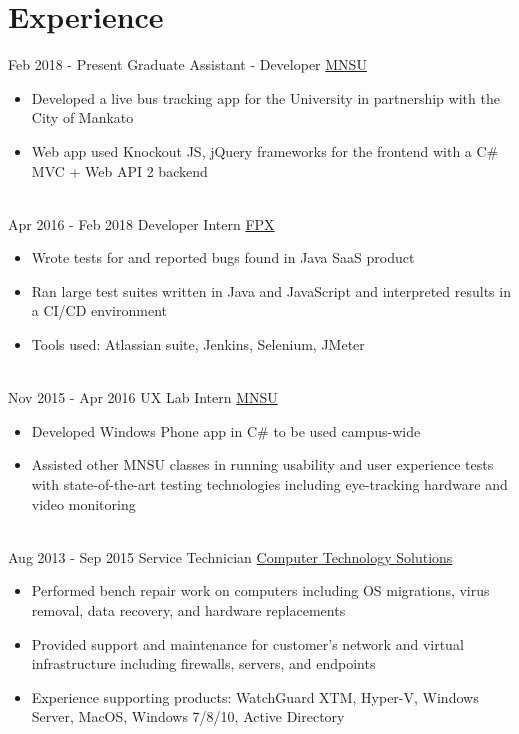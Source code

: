 \documentclass[a4paper]{twentysecondcv} %
\begin{document}
\section{Experience}

\begin{twenty} %
\twentyitem
    	{Feb 2018 -}
		{Present}
        {Graduate Assistant - Developer}
        {\href{https://mankato.mnsu.edu/}{MNSU}}
        {}
        {\begin{itemize}
        \item Developed a live bus tracking app for the University in partnership with the City of Mankato
        \item Web app used Knockout JS, jQuery frameworks for the  frontend with a C\# MVC + Web API 2 backend
        \end{itemize}}
        \\
	\twentyitem
    	{Apr 2016 -}
		{Feb 2018}
        {Developer Intern}
        {\href{https://www.fpx.com}{FPX}}
        {}
        {
        {\begin{itemize}
        \item Wrote tests for and reported bugs found in Java SaaS product
        \item Ran large test suites written in Java and JavaScript and interpreted results in a CI/CD environment
        \item Tools used: Atlassian suite, Jenkins, Selenium, JMeter
    \end{itemize}}
        }
    \\   
    \twentyitem
   		{Nov 2015 -}
		{Apr 2016}
        {UX Lab Intern}
        {\href{https://mankato.mnsu.edu/}{MNSU}}
        {}
        {
        {\begin{itemize}
        \item Developed Windows Phone app in C\# to be used campus-wide
        \item Assisted other MNSU classes in running usability and user experience tests with state-of-the-art testing technologies including eye-tracking hardware and video monitoring

    \end{itemize}}
        }
     \\
     \twentyitem
   		{Aug 2013 -}
		{Sep 2015}
        {Service Technician}
        {\href{https://www.yourcts.net}{Computer Technology Solutions}}
        {}
        {
        \begin{itemize}
        \item Performed bench repair work on computers including OS migrations, virus removal, data recovery, and hardware replacements
        \item Provided support and maintenance for customer's network and virtual infrastructure including firewalls, servers, and endpoints
        \item Experience supporting products: WatchGuard XTM, Hyper-V, Windows Server, MacOS, Windows 7/8/10, Active Directory
        

\end{itemize}}
\end{twenty}
\end{document}
